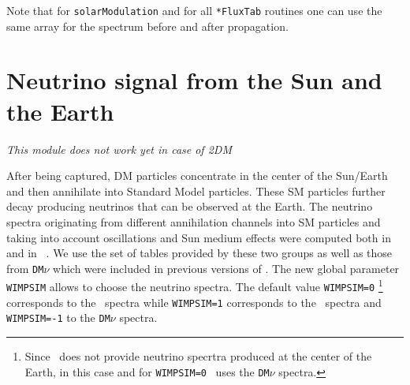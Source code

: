 \documentclass[12pt,a4paper]{article}
\begin{document}
Note that for \verb|solarModulation| and for  all \verb|*FluxTab| 
routines one can use  the same array for the spectrum before and after propagation. 




\section{Neutrino signal from the Sun and the Earth }
\label{sec:neutrino}

\begin{center}
{\it This module
does not work yet in case of 2DM}
\end{center}

After being captured, DM particles concentrate in the center of the Sun/Earth and 
then  annihilate into Standard Model particles. These SM particles further decay producing neutrinos that can be 
observed at the Earth.  The neutrino spectra originating from
different annihilation channels into SM particles and
taking into account oscillations  and Sun medium effects were 
computed both in
\wimpsim~\cite{Blennow:2007tw} and in 
\pppc~\cite{Baratella:2013fya}. We use the set of tables
provided by these two groups as well as  those from  {\tt DM$\nu$}
\cite{Cirelli:2005gh}  which were included in previous versions of \micro.
The new global parameter {\tt WIMPSIM}  allows to
choose  the   neutrino spectra. The default value  {\tt WIMPSIM=0} \footnote{Since \pppc\ does not provide neutrino specrtra produced at the center of the
Earth, in this case  and for {\tt WIMPSIM=0} \micro\ uses the {\tt DM$\nu$} spectra.}
corresponds to the \pppc\ spectra while  {\tt WIMPSIM=1} corresponds to the
\wimpsim\  spectra and  {\tt WIMPSIM=-1}  to the 
 {\tt DM$\nu$} spectra. 
  
\end{document}
